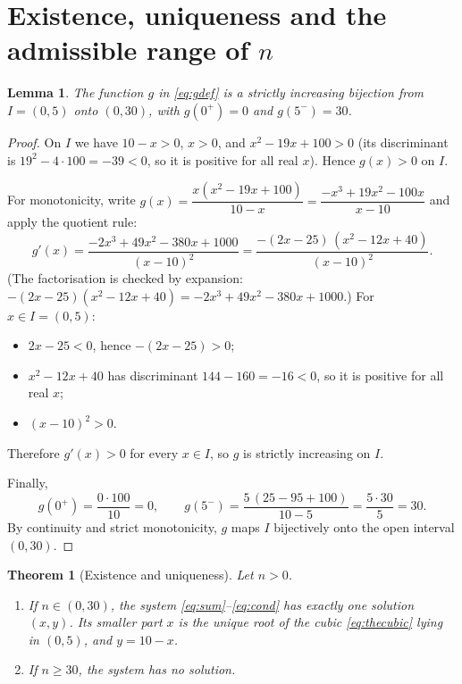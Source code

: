 \documentclass{amsart}
\newtheorem{theorem}{Theorem}
\newtheorem{lemma}{Lemma}
\theoremstyle{remark}
\begin{document}
\section{Existence, uniqueness and the admissible range of \texorpdfstring{$n$}{n}}

\begin{lemma}\label{lem:mono}
The function $g$ in \eqref{eq:gdef} is a strictly increasing bijection from
$I=(0,5)$ onto $(0,30)$, with $g(0^{+})=0$ and $g(5^{-})=30$.
\end{lemma}

\begin{proof}
On $I$ we have $10-x>0$, $x>0$, and $x^{2}-19x+100>0$ (its discriminant is
$19^{2}-4\cdot100=-39<0$, so it is positive for all real $x$). Hence
$g(x)>0$ on $I$.

For monotonicity, write
$g(x)=\dfrac{x(x^{2}-19x+100)}{10-x}=\dfrac{-x^{3}+19x^{2}-100x}{x-10}$ and
apply the quotient rule:
\[
g'(x)=\frac{-2x^{3}+49x^{2}-380x+1000}{(x-10)^{2}}
     =\frac{-(2x-25)\,(x^{2}-12x+40)}{(x-10)^{2}} .
\]
(The factorisation is checked by expansion:
$-(2x-25)(x^{2}-12x+40)=-2x^{3}+49x^{2}-380x+1000$.) For $x\in I=(0,5)$:
\begin{itemize}
\item $2x-25<0$, hence $-(2x-25)>0$;
\item $x^{2}-12x+40$ has discriminant $144-160=-16<0$, so it is positive for
      all real $x$;
\item $(x-10)^{2}>0$.
\end{itemize}
Therefore $g'(x)>0$ for every $x\in I$, so $g$ is strictly increasing on $I$.

Finally,
\[
g(0^{+})=\frac{0\cdot100}{10}=0,
\qquad
g(5^{-})=\frac{5\,(25-95+100)}{10-5}=\frac{5\cdot30}{5}=30 .
\]
By continuity and strict monotonicity, $g$ maps $I$ bijectively onto the open
interval $(0,30)$.
\end{proof}

\begin{theorem}[Existence and uniqueness]\label{thm:main}
Let $n>0$.
\begin{enumerate}
\item If $n\in(0,30)$, the system \eqref{eq:sum}--\eqref{eq:cond} has exactly
one solution $(x,y)$. Its smaller part $x$ is the unique root of the cubic
\eqref{eq:thecubic} lying in $(0,5)$, and $y=10-x$.
\item If $n\ge 30$, the system has no solution.
\end{enumerate}
\end{theorem}
\end{document}
